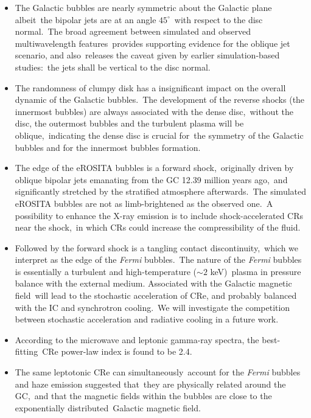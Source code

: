 \documentclass[twocolumn]{aastex631}
\begin{document}
\begin{itemize}

\item The Galactic bubbles are nearly symmetric about the Galactic plane albeit\
      the bipolar jets are at an angle $45^{\circ}$\
      with respect to the disc normal.\
      The broad agreement between simulated and observed multiwavelength features\
      provides supporting evidence for the oblique jet scenario, and also\
      releases the caveat given by earlier simulation-based studies:\
      the jets shall be vertical to the disc normal.
\item The randomness of clumpy disk has a insignificant impact on the overall dynamic of the Galactic bubbles.\
      The development of the reverse shocks (the innermost bubbles) are always associated with the dense disc,\
      without the disc, the outermost bubbles and the turbulent plasma will be oblique,\
      indicating the dense disc is crucial for\
      the symmetry of the Galactic bubbles and for the innermost bubbles formation.
\item The edge of the eROSITA bubbles is a forward shock,\
      originally driven by oblique bipolar jets emanating from the GC 12.39 million years ago,\
      and significantly stretched by the stratified atmosphere afterwards.\
      The simulated eROSITA bubbles are not as limb-brightened as the observed one.\
      A possibility to enhance the X-ray emission is to include shock-accelerated CRs near the shock,\
      in which CRs could increase the compressibility of the fluid.\
\item Followed by the forward shock is a tangling contact discontinuity,\
      which we interpret as the edge of the \textit{Fermi} bubbles.\
      The nature of the \textit{Fermi} bubbles is essentially a turbulent and high-temperature ($\sim2$ keV)\
      plasma in pressure balance with the external medium. Associated with the Galactic magnetic field\
      will lead to the stochastic acceleration of CRe, and probably balanced with the IC and synchrotron cooling.\
      We will investigate the competition between stochastic acceleration and radiative cooling in a future work.
\item According to the microwave and leptonic gamma-ray spectra, the best-fitting\
      CRe power-law index is found to be 2.4.
\item The same leptotonic CRe can simultaneously\
      account for the \textit{Fermi} bubbles and haze emission suggested that\
      they are physically related around the GC,\
      and that the magnetic fields within the bubbles are close to the exponentially distributed\
      Galactic magnetic field.
\end{itemize}
\end{document}
